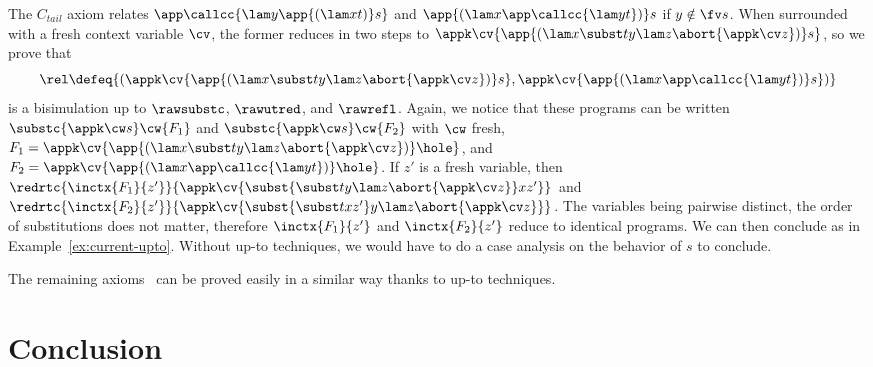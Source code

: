 \documentclass{lmcs}
\theoremstyle{defC}
\begin{document}
\begin{exa}
  The $C_{tail}$ axiom relates $\app \callcc {\lam y {\app {(\lam x t)} s}}$ and
  $\app {(\lam x {\app \callcc {\lam y t}})} s$ if $y \notin \fv s$. When
  surrounded with a fresh context variable $\cv$, the former reduces in two
  steps to $\appk \cv {\app {(\lam x {\subst t y {\lam z {\abort {\appk \cv
              z}}}})} s}$, so we prove that
  \[\rel \defeq \{(\appk \cv {\app {(\lam x {\subst t y {\lam z {\abort {\appk \cv
                z}}}})} s}, \appk \cv {\app {(\lam x {\app \callcc {\lam y t}})}
      s})\}\] is a bisimulation up to $\rawsubstc$, $\rawutred$, and
  $\rawrefl$. Again, we notice that these programs can be written
  $\substc {\appk \cw s} \cw {F_1}$ and $\substc {\appk \cw s} \cw {F_2}$ with
  $\cw$ fresh,
  $F_1 = \appk \cv {\app {(\lam x {\subst t y {\lam z {\abort {\appk \cv z}}}})}
    \hole}$, and
  $F_2 = \appk \cv {\app {(\lam x {\app \callcc {\lam y t}})} \hole}$. If $z'$
  is a fresh variable, then
  $\redrtc{\inctx {F_1}{z'}}{\appk \cv {\subst{\subst t y {\lam z {\abort {\appk
              \cv z}}}} x {z'}}}$ and
  $\redrtc{\inctx {F_2}{z'}}{\appk \cv {\subst {\subst t x {z'}} y {\lam z
        {\abort {\appk \cv z}}}}}$. The variables being pairwise distinct, the
  order of substitutions does not matter, therefore $\inctx {F_1}{z'}$ and
  $\inctx {F_2}{z'}$ reduce to identical programs. We can then conclude as in
  Example~\ref{ex:current-upto}. Without up-to techniques, we would have to do a
  case analysis on the behavior of $s$ to conclude.
\end{exa}
The remaining axioms~\cite{Sabry-Felleisen:LFP92} can be proved easily in a
similar way thanks to up-to techniques.


\section{Conclusion}%
\label{s:conclusion}
\end{document}
